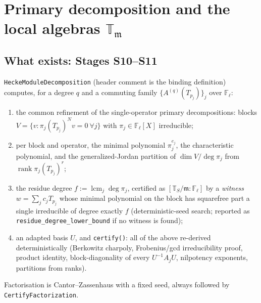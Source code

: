 \documentclass[11pt]{article}
\theoremstyle{remark}
\newcommand{\F}{\mathbb{F}}
\newcommand{\Fl}{\F_\ell}
\DeclareMathOperator{\rank}{rank}
\newcommand{\T}{\mathbb{T}}
\newcommand{\m}{\mathfrak{m}}
\begin{document}
\section{Primary decomposition and the local algebras \texorpdfstring{$\T_\m$}{T\_m}}\label{sec:primary}

\subsection{What exists: Stages S10--S11}
\texttt{HeckeModuleDecomposition} (header comment is the binding definition) computes, for a
degree $q$ and a commuting family $\{A^{(q)}(T_{p_j})\}_j$ over $\Fl$:
\begin{enumerate}[label=(\roman*)]
\item the common refinement of the single-operator primary decompositions: blocks
  $V=\{v:\pi_j(T_{p_j})^{N}v=0\ \forall j\}$ with $\pi_j\in\Fl[X]$ irreducible;
\item per block and operator, the minimal polynomial $\pi_j^{e_j}$, the characteristic
  polynomial, and the generalized-Jordan partition of $\dim V/\deg\pi_j$ from
  $\rank\pi_j(T_{p_j})^r$;
\item the residue degree $f:=\operatorname{lcm}_j\deg\pi_j$, certified as
  $[\T_S/\m:\Fl]$ by a \emph{witness} $w=\sum_jc_jT_{p_j}$ whose minimal polynomial on the block
  has squarefree part a single irreducible of degree exactly $f$ (deterministic-seed search;
  reported as \texttt{residue\_degree\_lower\_bound} if no witness is found);
\item an adapted basis $U$, and \texttt{certify()}: all of the above re-derived
  deterministically (Berkowitz charpoly, Frobenius/gcd irreducibility proof, product identity,
  block-diagonality of every $U^{-1}A_jU$, nilpotency exponents, partitions from ranks).
\end{enumerate}
Factorisation is Cantor--Zassenhaus with a fixed seed, always followed by
\texttt{CertifyFactorization}.
\end{document}
